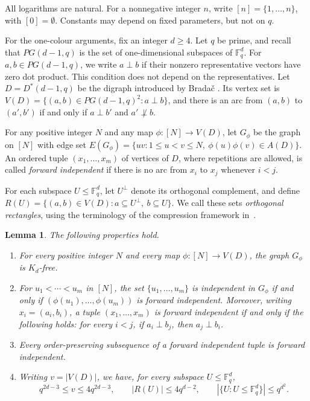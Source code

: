 \documentclass[11pt,a4paper]{article}
\numberwithin{equation}{section}
\newtheorem{lemma}[theorem]{Lemma}
\newcommand{\Fq}{\mathbb F_q}
\begin{document}
All logarithms are natural. For a nonnegative integer $n$, write
$[n]=\{1,\ldots,n\}$, with $[0]=\emptyset$.
Constants may depend on fixed parameters, but not on $q$.

For the one-colour arguments, fix an integer $d\ge4$.
Let $q$ be prime, and recall that $PG(d-1,q)$ is the set of
one-dimensional subspaces of $\Fq^d$. For $a,b\in PG(d-1,q)$,
we write $a\perp b$ if their nonzero representative vectors have
zero dot product. This condition does not depend on the representatives.
Let $D=D^*(d-1,q)$ be the digraph introduced by Brada\v{c}
\cite[Section~2.5]{Bradac}. Its vertex set is
$V(D)=\{(a,b)\in PG(d-1,q)^2:a\perp b\}$,
and there is an arc from $(a,b)$ to $(a',b')$ if and only if
$a\perp b'$ and $a'\not\perp b$.

For any positive integer $N$ and any map
$\phi:[N]\to V(D)$, let $G_\phi$ be the graph on $[N]$
with edge set
$E(G_\phi)=\{uv:1\le u<v\le N,\ \phi(u)\phi(v)\in A(D)\}$.
An ordered tuple $(x_1,\ldots,x_m)$ of vertices of $D$,
where repetitions are allowed, is called \emph{forward independent}
if there is no arc from $x_i$ to $x_j$ whenever $i<j$.

For each subspace $U\le\Fq^d$, let $U^\perp$ denote its
orthogonal complement, and define
$R(U)=\{(a,b)\in V(D):a\subseteq U^\perp,\ b\subseteq U\}$.
We call these sets \emph{orthogonal rectangles}, using the terminology
of the compression framework in~\cite{OAI}.

\begin{lemma}\label{lem:construction}
The following properties hold.
\begin{enumerate}
\item[(i)] For every positive integer $N$ and every map
$\phi:[N]\to V(D)$, the graph $G_\phi$ is $K_d$-free.

\item[(ii)] For $u_1<\cdots<u_m$ in $[N]$, the set
$\{u_1,\ldots,u_m\}$ is independent in $G_\phi$ if and only if
$(\phi(u_1),\ldots,\phi(u_m))$ is forward independent.
Moreover, writing $x_i=(a_i,b_i)$, a tuple
$(x_1,\ldots,x_m)$ is forward independent if and only if the
following holds: for every $i<j$, if $a_i\perp b_j$, then
$a_j\perp b_i$.

\item[(iii)] Every order-preserving subsequence of a forward
independent tuple is forward independent.

\item[(iv)] Writing $v=|V(D)|$, we have, for every subspace
$U\le\Fq^d$,
\begin{equation}\label{eq:geometry}
 q^{2d-3}\le v\le4q^{2d-3},\qquad
 |R(U)|\le4q^{d-2},\qquad
 |\{U:U\le\Fq^d\}|\le q^{d^2}.
\end{equation}
\end{enumerate}
\end{lemma}
\end{document}
